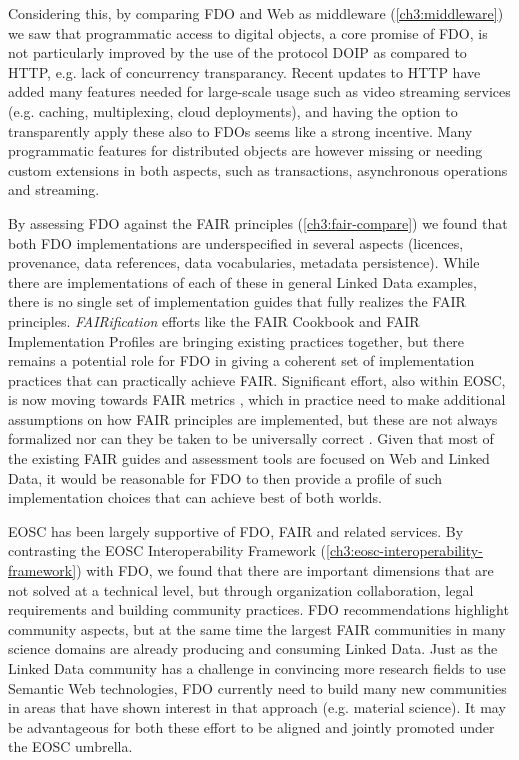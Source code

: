 Considering this, by comparing FDO and Web as middleware (\vref{ch3:middleware}) we saw that programmatic access to digital objects, a core promise of FDO, is not particularly improved by the use of the protocol DOIP as compared to HTTP, e.g. lack of concurrency transparancy. Recent updates to HTTP have added many features needed for large-scale usage such as video streaming services (e.g. caching, multiplexing, cloud deployments), and having the option to transparently apply these also to FDOs seems like a strong incentive. Many programmatic features for distributed objects are however missing or needing custom extensions in both aspects, such as transactions, asynchronous operations and streaming.

By assessing FDO against the FAIR principles (\vref{ch3:fair-compare}) we found that both FDO implementations are underspecified in several aspects (licences, provenance, data references, data vocabularies, metadata persistence). While there are implementations of each of these in general Linked Data examples, there is no single set of implementation guides that fully realizes the FAIR principles. \emph{FAIRification} efforts like the FAIR Cookbook \cite{faircookbook} and FAIR Implementation Profiles \cite{FIP} are bringing existing practices together, but there remains a potential role for FDO in giving a coherent set of implementation practices that can practically achieve FAIR. Significant effort, also within EOSC, is now moving towards FAIR metrics \cite{Devaraju_2021}, which in practice need to make additional assumptions on how FAIR principles are implemented, but these are not always formalized \cite{10.5281/zenodo.7463421} nor can they be taken to be universally correct \cite{10.5281/zenodo.7848102}. Given that most of the existing FAIR guides and assessment tools are focused on Web and Linked Data, it would be reasonable for FDO to then provide a profile of such implementation choices that can achieve best of both worlds.

EOSC has been largely supportive of FDO, FAIR and related services. By contrasting the EOSC Interoperability Framework (\vref{ch3:eosc-interoperability-framework}) with FDO, we found that there are important dimensions that are not solved at a technical level, but through organization collaboration, legal requirements and building community practices. FDO recommendations highlight community aspects, but at the same time the largest FAIR communities in many science domains are already producing and consuming Linked Data. Just as the Linked Data community has a challenge in convincing more research fields to use Semantic Web technologies, FDO currently need to build many new communities in areas that have shown interest in that approach (e.g. material science).  It may be advantageous for both these effort to be aligned and jointly promoted under the EOSC umbrella. 



